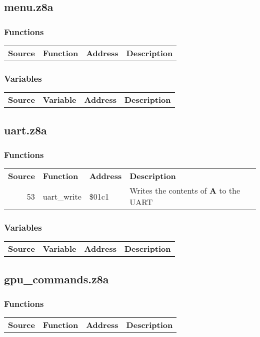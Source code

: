 \subsection{menu.z8a}
\subsubsection{Functions}
\begin{tabular}{rllp{7cm}}
 \textbf{Source}&\textbf{Function}&\textbf{Address}&\textbf{Description}\\
\end{tabular}

\subsubsection{Variables}
\begin{tabular}{rllp{7cm}}
 \textbf{Source}&\textbf{Variable}&\textbf{Address}&\textbf{Description}\\
\end{tabular}

\subsection{uart.z8a}
\subsubsection{Functions}
\begin{tabular}{rllp{7cm}}
 \textbf{Source}&\textbf{Function}&\textbf{Address}&\textbf{Description}\\
 53&uart\_write&\$01c1&Writes the contents of \textbf{A} to the UART\\
\end{tabular}

\subsubsection{Variables}
\begin{tabular}{rllp{7cm}}
 \textbf{Source}&\textbf{Variable}&\textbf{Address}&\textbf{Description}\\
\end{tabular}

\subsection{gpu\_commands.z8a}
\subsubsection{Functions}
\begin{tabular}{rllp{7cm}}
 \textbf{Source}&\textbf{Function}&\textbf{Address}&\textbf{Description}\\
\end{tabular}

